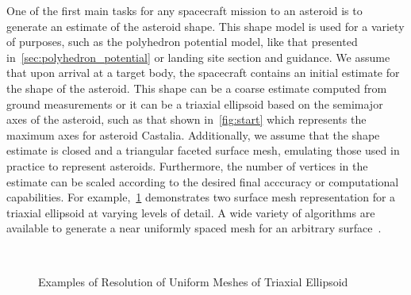 One of the first main tasks for any spacecraft mission to an asteroid is to generate an estimate of the asteroid shape.
This shape model is used for a variety of purposes, such as the polyhedron potential model, like that presented in~\cref{sec:polyhedron_potential} or landing site section and guidance.
We assume that upon arrival at a target body, the spacecraft contains an initial estimate for the shape of the asteroid.
This shape can be a coarse estimate computed from ground measurements or it can be a triaxial ellipsoid based on the semimajor axes of the asteroid, such as that shown in~\cref{fig:start} which represents the maximum axes for asteroid Castalia.
Additionally, we assume that the shape estimate is closed and a triangular faceted surface mesh, emulating those used in practice to represent asteroids.
Furthermore, the number of vertices in the estimate can be scaled according to the desired final acccuracy or computational capabilities.
For example,~\cref{fig:uniform_mesh} demonstrates two surface mesh representation for a triaxial ellipsoid at varying levels of detail. 
A wide variety of algorithms are available to generate a near uniformly spaced mesh for an arbitrary surface~\cite{persson2004,boissonnat2005}.
\begin{figure}[htbp]
    \centering
    ~
    \caption{Examples of Resolution of Uniform Meshes of Triaxial Ellipsoid~\label{fig:uniform_mesh}}
\end{figure}

